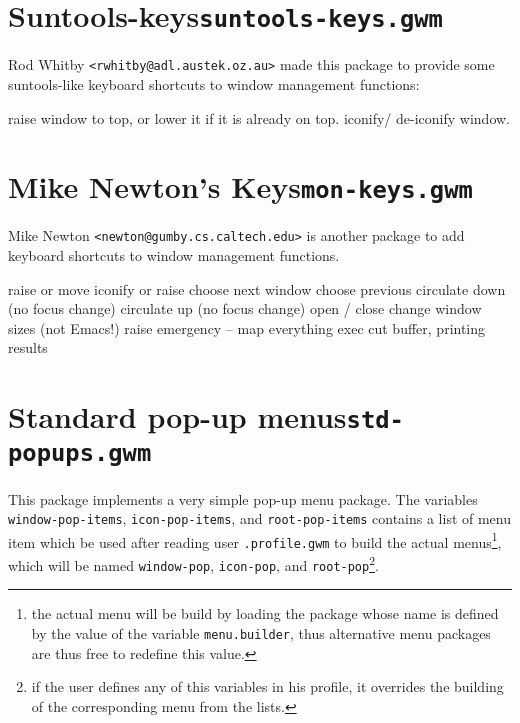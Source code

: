 \section{Suntools-keys{\tt suntools-keys.gwm}}
\label{suntools-keys}

Rod Whitby \verb|<rwhitby@adl.austek.oz.au>| made this package to
provide some suntools-like keyboard shortcuts to window management functions:

\begin{description}
 raise window to top, or lower it if it is already on top.
 iconify/ de-iconify window.
\end{description}

\section{Mike Newton's Keys\hfill{\tt mon-keys.gwm}}
\label{mon-keys}

Mike Newton \verb|<newton@gumby.cs.caltech.edu>| is another package to add 
keyboard shortcuts to window management functions.

\begin{description}
 raise or move
 iconify or raise
 choose next window
 choose previous
 circulate down (no focus change)
 circulate up (no focus change)
 open / close
 change window sizes (not Emacs!)
 raise 
 emergency -- map everything
 exec cut buffer, printing results
\end{description}	

\section{Standard pop-up menus\hfill{\tt std-popups.gwm}}
\label{std-popups}

This package implements a very simple pop-up menu package. The variables
\verb"window-pop-items", \verb"icon-pop-items", and \verb"root-pop-items"
contains a list of menu item which be used after reading user
\verb".profile.gwm" to build the actual menus\footnote{the actual menu will be
build by loading the package whose name is defined by the value of the
variable \verb"menu.builder", thus alternative menu packages are thus free to
redefine this value.},
which will be named \verb"window-pop", \verb"icon-pop", and
\verb"root-pop"\footnote{if the user defines any of this variables in his
profile, it overrides the building of the corresponding menu from the lists.}.

